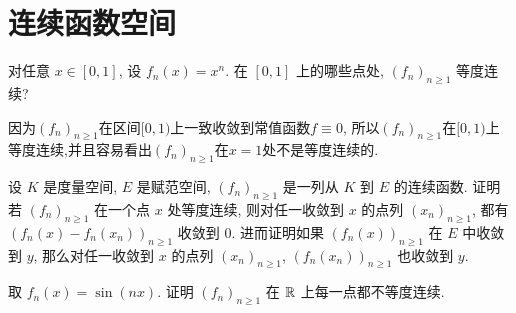 \chapter{连续函数空间}
\thispagestyle{empty}



\begin{exercise}
    对任意 $x\in [0,1]$, 设 $f_n(x)=x^n$. 在 $[0,1]$ 上的哪些点处, $(f_n)_{n\geq 1}$ 等度连续?
\end{exercise}

\begin{solve}
    因为$(f_n)_{n\geq 1}$在区间$[0,1)$上一致收敛到常值函数$f\equiv0$,
    所以$(f_n)_{n\geq 1}$在$[0,1)$上等度连续,并且容易看出$(f_n)_{n\geq 1}$在$x=1$处不是等度连续的.
\end{solve}



\begin{exercise}
    设 $K$ 是度量空间, $E$ 是赋范空间, $\left(f_{n}\right)_{n\geq 1}$ 是一列从 $K$ 到 $E$ 的连续函数. 
    证明若 $(f_{n})_{n\geq 1}$ 在一个点 $x$ 处等度连续, 则对任一收敛到 $x$ 
    的点列 $(x_{n})_{n\geq 1}$, 都有 $(f_{n}(x)-f_{n}(x_n))_{n\geq 1}$ 收敛到 $0$. 
    进而证明如果 $(f_{n}(x))_{n\geq 1}$ 在 $E$ 中收敛到 $y$, 
    那么对任一收敛到 $x$ 的点列 $(x_{n})_{n\geq 1}$, $(f_{n}(x_{n}))_{n\geq 1}$ 也收敛到 $y$.

    取 $f_{n}(x)=\sin(nx)$. 证明 $(f_{n})_{n\geq 1}$ 在 $\mathbb{R}$ 上每一点都不等度连续.
\end{exercise}

